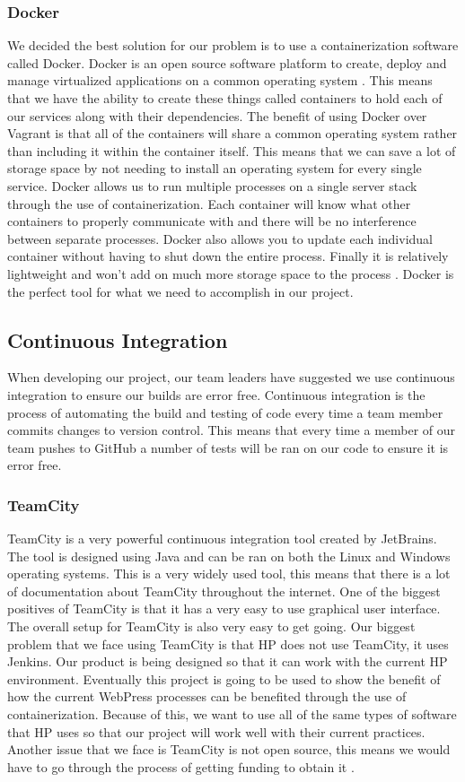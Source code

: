 \documentclass[onecolumn, draftclsnofoot,10pt, compsoc]{IEEEtran}
\begin{document}
    \subsubsection{Docker}
    We decided the best solution for our problem is to use a containerization software called Docker. Docker is an open source software platform to create, deploy and manage virtualized applications on a common operating system \cite{docker}. This means that we have the ability to create these things called containers to hold each of our services along with their dependencies. The benefit of using Docker over Vagrant is that all of the containers will share a common operating system rather than including it within the container itself. This means that we can save a lot of storage space by not needing to install an operating system for every single service. Docker allows us to run multiple processes on a single server stack through the use of containerization. Each container will know what other containers to properly communicate with and there will be no interference between separate processes. Docker also allows you to update each individual container without having to shut down the entire process. Finally it is relatively lightweight and won't add on much more storage space to the process \cite{docker}. Docker is the perfect tool for what we need to accomplish in our project.

    
\subsection{Continuous Integration}
When developing our project, our team leaders have suggested we use continuous integration to ensure our builds are error free. Continuous integration is the process of automating the build and testing of code every time a team member commits changes to version control. This means that every time a member of our team pushes to GitHub a number of tests will be ran on our code to ensure it is error free.
\subsubsection{TeamCity}
TeamCity is a very powerful continuous integration tool created by JetBrains. The tool is designed using Java and can be ran on both the Linux and Windows operating systems. This is a very widely used tool, this means that there is a lot of documentation about TeamCity throughout the internet. One of the biggest positives of TeamCity is that it has a very easy to use graphical user interface. The overall setup for TeamCity is also very easy to get going. Our biggest problem that we face using TeamCity is that HP does not use TeamCity, it uses Jenkins. Our product is being designed so that it can work with the current HP environment. Eventually this project is going to be used to show the benefit of how the current WebPress processes can be benefited through the use of containerization. Because of this, we want to use all of the same types of software that HP uses so that our project will work well with their current practices. Another issue that we face is TeamCity is not open source, this means we would have to go through the process of getting funding to obtain it \cite{TeamCity}. 
\end{document}
